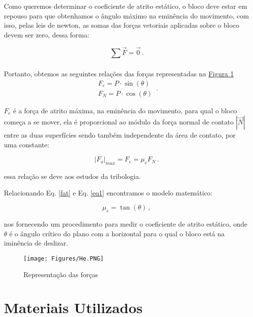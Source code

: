 \documentclass[12pt]{article}
\numberwithin{equation}{section} %
\begin{document}
Como queremos determinar o coeficiente de atrito estático, o bloco deve estar em repouso para que obtenhamos o ângulo máximo na eminência do movimento, com isso, pelas leis de newton, as somas das forças vetoriais aplicadas sobre o bloco devem ser zero, dessa forma: 

\begin{equation}
\label{eq2}
\sum_{}^{}\vec{F}=\vec{0} \,.
\end{equation}

Portanto, obtemos as seguintes relações das forças representadas na   \hyperref[fig:Forces]{Figura \ref{fig:Forces} }
\begin{equation}
\label{eq1}
\begin{matrix}F_{e}=P\cdot \sin{(\theta)}
 \\
F_{N}=P\cdot \cos{(\theta)}
\end{matrix}  \,.
\end{equation}

$F_{e}$ é a força de atrito máxima, na eminência do movimento, para qual o bloco começa a se mover, ela é proporcional ao módulo da força normal de contato $|\vec{N}|$ entre as duas superfícies sendo também independente da área de contato, por uma constante:

\begin{equation}
\label{fat}
|F_{a}|_{max} = F_{e} = \mu_{e} F_{N} \,.
\end{equation}


essa relação se deve aos estudos da tribologia. 

Relacionando Eq. \eqref{fat} e Eq. \eqref{eq1} encontramos o modelo matemático:


\begin{equation}
\label{mu}
\mu_{e}=\tan(\theta) \,,
\end{equation}

nos fornecendo um procedimento para medir o coeficiente de atrito estático, onde $\theta$ é o ângulo crítico do plano com a horizontal para o qual o bloco está na iminência de deslizar.

\begin{figure}[ht]
\centering
\texttt{[image: Figures/He.PNG]}
\caption{Representação das forças}
\label{fig:Forces}
\end{figure}

\section{Materiais Utilizados}
\end{document}
